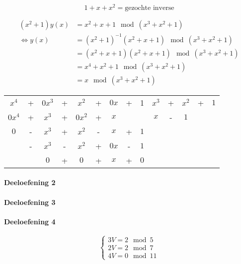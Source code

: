 \documentclass[12pt]{article}
\begin{document}
	\begin{equation}
		1+x+x^{2} = \text{gezochte inverse} 
	\end{equation}

	\begin{align}
	(x^{2}+1)y(x) &= x^{2}+x+1 \mod(x^{3}+x^{2}+1) \\
	\Leftrightarrow y(x) &= (x^{2}+1)^{-1} (x^{2}+x+1) \mod(x^{3}+x^{2}+1) \\
	&= (x^{2}+x+1)(x^{2}+x+1) \mod(x^{3}+x^{2}+1) \\
	&= x^{4}+x^{2}+1 \mod(x^{3}+x^{2}+1) \\
	&= x \mod(x^{3}+x^{2}+1)
	\end{align}

	\begin{table}[H]
	\centering
	\begin{tabular}{ccccccccc|ccccc}
		$x^{4}$&+&$0x^{3}$&+&$x^{2}$&+&$0x$&+&1&$x^{3}$&+&$x^{2}$&+&$1$ \\
		\cline{10-14}
		$0x^{4}$&+&$x^{3}$&+&$0x^{2}$&+&$x$& & &$x$&-&$1$& & \\
		\cline{1-9}
		$0$&-&$x^{3}$&+&$x^{2}$&-&$x$&+&$1$   &&&&& \\
		 &-&$x^{3}$&-&$x^{2}$&+&$0x$&-&$1$   &&&&& \\
		\cline{2-9}
		 & &$0$&+&$0$&+&$x$&+&$0$   &&&&& \\
	\end{tabular}
	\end{table}

	\paragraph{Deeloefening 2}

	\paragraph{Deeloefening 3}

	\paragraph{Deeloefening 4}

	\begin{equation}
        \begin{cases}
            3V = 2 \mod 5 \\
            2V = 2 \mod 7 \\
            4V = 0 \mod 11
        \end{cases}
    \end{equation}
    
\end{document}
